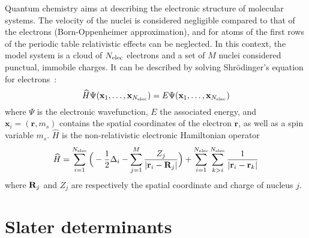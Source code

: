 \documentclass[./thesis.tex]{subfiles}
\begin{document}
\label{chap:METHODS}

Quantum chemistry aims at describing the electronic structure of molecular
systems.  The velocity of the nuclei is considered negligible compared to that
of the electrons (Born-Oppenheimer approximation), and for atoms of the first
rows of the periodic table relativistic effects can be neglected.  In this
context, the model system is a cloud of ${N_\text{elec}}$ electrons and a set of $M$ nuclei
considered punctual, immobile charges. It can be described by solving
Shrödinger's equation for electrons~:
\begin{equation}
 \widehat{H} \Psi({\bf x}_1,\dots,{\bf x}_{N_\text{elec}}) = E \Psi({\bf x}_1,\dots,{\bf x}_{N_\text{elec}})
\end{equation}
where $\Psi$ is the electronic wavefunction, $E$ the associated energy, and $\mathbf{x}_i = (\textbf{r},m_s)$
contains the spatial coordinates of the electron $\textbf{r}$, as well as a spin variable $m_s$.
$\widehat H$ is the non-relativistic electronic Hamiltonian operator
\begin{equation}
\widehat{H} = \sum_{i=1}^{{N_\text{elec}}} \Big ( -\frac{1}{2} \Delta_i - \sum_{j=1}^M \frac{Z_j}{|{\bf r}_i - {\bf R}_j|} \Big ) + \sum_{i=1}^{{N_\text{elec}}} \sum_{k>i}^{{N_\text{elec}}} \frac{1}{|{\bf r}_i - {\bf r}_k|}
\end{equation}
where ${\bf R}_j$ and $Z_j$ are respectively the spatial coordinate and charge of nucleus $j$.

\section{Slater determinants}
\end{document}
